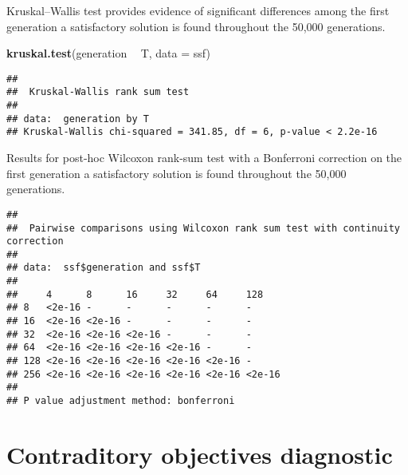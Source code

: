 \documentclass[]{book}
\newenvironment{Shaded}{\begin{snugshade}}{\end{snugshade}}
\newcommand{\DataTypeTok}[1]{\textcolor[rgb]{0.13,0.29,0.53}{#1}}
\newcommand{\KeywordTok}[1]{\textcolor[rgb]{0.13,0.29,0.53}{\textbf{#1}}}
\newcommand{\NormalTok}[1]{#1}
\newcommand{\OperatorTok}[1]{\textcolor[rgb]{0.81,0.36,0.00}{\textbf{#1}}}
\newcommand{\OtherTok}[1]{\textcolor[rgb]{0.56,0.35,0.01}{#1}}
\newcommand{\StringTok}[1]{\textcolor[rgb]{0.31,0.60,0.02}{#1}}
\begin{document}
Kruskal--Wallis test provides evidence of significant differences among the first generation a satisfactory solution is found throughout the 50,000 generations.

\begin{Shaded}
\begin{Highlighting}[]
\KeywordTok{kruskal.test}\NormalTok{(generation }\OperatorTok{~}\StringTok{ }\NormalTok{T, }\DataTypeTok{data =}\NormalTok{ ssf)}
\end{Highlighting}
\end{Shaded}

\begin{verbatim}
## 
##  Kruskal-Wallis rank sum test
## 
## data:  generation by T
## Kruskal-Wallis chi-squared = 341.85, df = 6, p-value < 2.2e-16
\end{verbatim}

Results for post-hoc Wilcoxon rank-sum test with a Bonferroni correction on the first generation a satisfactory solution is found throughout the 50,000 generations.

\begin{Shaded}
\end{Shaded}

\begin{verbatim}
## 
##  Pairwise comparisons using Wilcoxon rank sum test with continuity correction 
## 
## data:  ssf$generation and ssf$T 
## 
##     4      8      16     32     64     128   
## 8   <2e-16 -      -      -      -      -     
## 16  <2e-16 <2e-16 -      -      -      -     
## 32  <2e-16 <2e-16 <2e-16 -      -      -     
## 64  <2e-16 <2e-16 <2e-16 <2e-16 -      -     
## 128 <2e-16 <2e-16 <2e-16 <2e-16 <2e-16 -     
## 256 <2e-16 <2e-16 <2e-16 <2e-16 <2e-16 <2e-16
## 
## P value adjustment method: bonferroni
\end{verbatim}

\hypertarget{contraditory-objectives-diagnostic}{%
\section{Contraditory objectives diagnostic}\label{contraditory-objectives-diagnostic}}
\end{document}
